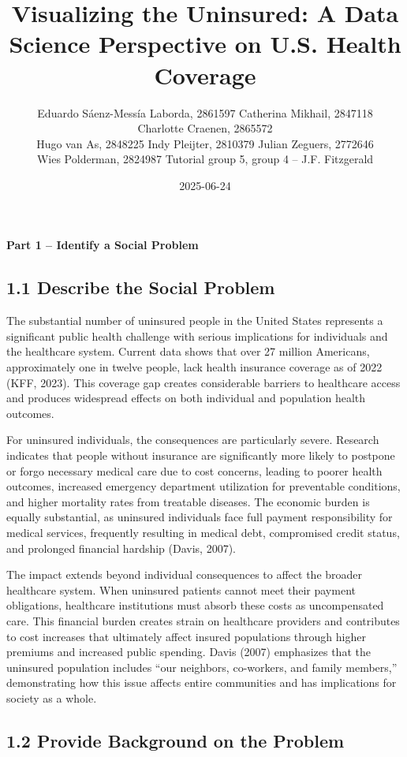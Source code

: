 \documentclass[
]{article}
\title{Visualizing the Uninsured: A Data Science Perspective on U.S.
Health Coverage}
\author{Eduardo Sáenz-Messía Laborda, 2861597 Catherina Mikhail,
2847118\\
Charlotte Craenen, 2865572\\
Hugo van As, 2848225 Indy Pleijter, 2810379 Julian Zeguers, 2772646\\
Wies Polderman, 2824987 Tutorial group 5, group 4 -- J.F. Fitzgerald}
\date{2025-06-24}
\begin{document}
\maketitle

{
\setcounter{tocdepth}{2}
\tableofcontents
}
\textbf{Part 1 -- Identify a Social Problem}

\subsection{1.1 Describe the Social
Problem}\label{describe-the-social-problem}

The substantial number of uninsured people in the United States
represents a significant public health challenge with serious
implications for individuals and the healthcare system. Current data
shows that over 27 million Americans, approximately one in twelve
people, lack health insurance coverage as of 2022 (KFF, 2023). This
coverage gap creates considerable barriers to healthcare access and
produces widespread effects on both individual and population health
outcomes.

For uninsured individuals, the consequences are particularly severe.
Research indicates that people without insurance are significantly more
likely to postpone or forgo necessary medical care due to cost concerns,
leading to poorer health outcomes, increased emergency department
utilization for preventable conditions, and higher mortality rates from
treatable diseases. The economic burden is equally substantial, as
uninsured individuals face full payment responsibility for medical
services, frequently resulting in medical debt, compromised credit
status, and prolonged financial hardship (Davis, 2007).

The impact extends beyond individual consequences to affect the broader
healthcare system. When uninsured patients cannot meet their payment
obligations, healthcare institutions must absorb these costs as
uncompensated care. This financial burden creates strain on healthcare
providers and contributes to cost increases that ultimately affect
insured populations through higher premiums and increased public
spending. Davis (2007) emphasizes that the uninsured population includes
``our neighbors, co-workers, and family members,'' demonstrating how
this issue affects entire communities and has implications for society
as a whole.

\subsection{1.2 Provide Background on the
Problem}\label{provide-background-on-the-problem}
\end{document}
